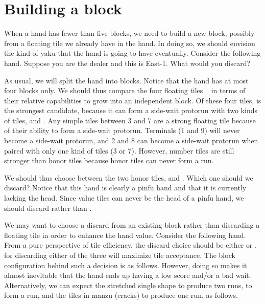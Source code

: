 \section{Building a block}

When a hand has fewer than five blocks, we need to build a new block, possibly from a floating tile we already have in the hand. In doing so, we should envision the kind of {\jap yaku} that the hand is going to have eventually. Consider the following hand. Suppose you are the dealer and this is East-1. What would you discard?

\bp
{}\zhong\bei
\ep

As usual, we will split the hand into blocks. Notice that the hand has at most four blocks only. 
\emj \label{hand:head}
We should thus compare the four floating tiles {\LARGE{}  \zhong ~\bei} in terms of their relative capabilities to grow into an independent block. Of these four tiles, {\LARGE{}} is the strongest candidate, because it can form a side-wait protorun with two kinds of tiles,  and . Any simple tiles between 3 and 7 are a strong floating tile because of their ability to form a side-wait protorun. Terminals (1 and 9) will never become a side-wait protorun, and 2 and 8 can become a side-wait protorun when paired with only one kind of tiles (3 or 7). However, number tiles are still stronger than honor tiles because honor tiles can never form a run. 

\bigskip
We should thus choose between the two honor tiles, {\LARGE\zhong} and {\LARGE\bei}. Which one should we discard? Notice that this hand is clearly a {\jap pinfu} hand and that it is currently lacking the head. Since value tiles can never be the head of a {\jap pinfu} hand, we should discard {\LARGE\zhong} rather than {\LARGE\bei}. 

\bigskip
We may want to choose a discard from an existing block rather than discarding a floating tile in order to enhance the hand value. Consider the following hand. 
\bp
{}
\ep
From a pure perspective of tile efficiency, the discard choice should be either {\LARGE{} } or {\LARGE{}}, for discarding either of the three will maximize tile acceptance. The block configuration behind such a  decision is as follows. 
\emj
However, doing so makes it almost inevitable that the hand ends up having a low score and/or a bad wait. Alternatively, we can expect the stretched single shape {\LARGE{}} to produce two runs, {\LARGE{}} to form a run, and the tiles in {\jap manzu} (cracks) to produce one run, as follows. 

